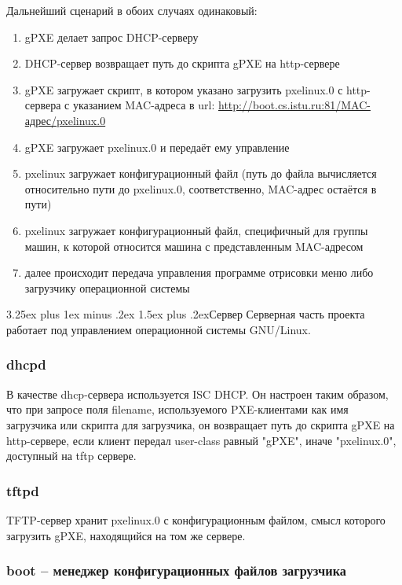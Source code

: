 \documentclass[11pt]{article}
\makeatletter
\renewcommand{\subsection}{\@startsection{subsection}{2}%
{\parindent}{3.25ex plus 1ex minus .2ex}%
{1.5ex plus .2ex}{\bfseries}}
\makeatother
\begin{document}
Дальнейший сценарий в обоих случаях одинаковый:
\begin{enumerate}
    \item gPXE делает запрос DHCP-серверу
    \item DHCP-сервер возвращает путь до скрипта gPXE на http-сервере
    \item gPXE загружает скрипт, в котором указано загрузить pxelinux.0
        с http-сервера с указанием MAC-адреса в url:
        \url{http://boot.cs.istu.ru:81/MAC-адрес/pxelinux.0}
    \item gPXE загружает pxelinux.0 и передаёт ему управление
    \item pxelinux загружает конфигурационный файл (путь до файла
        вычисляется относительно пути до pxelinux.0,
        соответственно, MAC-адрес остаётся в пути)
    \item pxelinux загружает конфигурационный файл,
        специфичный для группы машин, к которой относится машина
        с представленным MAC-адресом
    \item далее происходит передача управления программе отрисовки
        меню либо загрузчику операционной системы
\end{enumerate}

\subsection{Сервер}
Серверная часть проекта работает под управлением операционной
системы GNU/Linux.

\subsubsection{dhcpd}
В качестве dhcp-сервера используется ISC DHCP.
Он настроен таким образом, что при запросе поля
filename, используемого PXE-клиентами как имя
загрузчика или скрипта для загрузчика,
он возвращает путь до скрипта gPXE на http-сервере,
если клиент передал user-class равный "gPXE",
иначе "pxelinux.0", доступный на tftp сервере.

\subsubsection{tftpd}
TFTP-сервер хранит pxelinux.0 с конфигурационным
файлом, смысл которого загрузить gPXE, находящийся
на том же сервере.

\subsubsection{boot -- менеджер конфигурационных файлов загрузчика}
\end{document}
